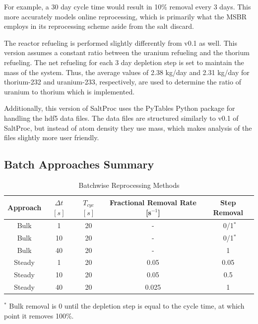 For example, a 30 day cycle time would result in 10\% removal every 3 days. This more accurately models online reprocessing, which is primarily what the MSBR employs in its reprocessing scheme aside from the salt discard.

The reactor refueling is performed slightly differently from v0.1 as well. This version assumes a constant ratio between the uranium refueling and the thorium refueling. The net refueling for each 3 day depletion step is set to maintain the mass of the system. Thus, the average values of 2.38 kg/day and 2.31 kg/day for thorium-232 and uranium-233, respectively, are used to determine the ratio of uranium to thorium which is implemented.

Additionally, this version of SaltProc uses the PyTables Python package for handling the hdf5 data files. The data files are structured similarly to v0.1 of SaltProc, but instead of atom density they use mass, which makes analysis of the files slightly more user friendly.

\subsection{Batch Approaches Summary}

\begin{table}[H]
\renewcommand{\arraystretch}{1.25}
\caption{Batchwise Reprocessing Methods}
\label{tab:batch_methods}
\begin{center}
\begin{tabular}{ | c | c | c | c | c | }
 \hline
        Approach & $\Delta t$ $[s]$ & $T_{cyc}$ $[s]$ & Fractional Removal Rate [s$^{-1}$] & Step Removal\\
 \hline
 \hline
        Bulk & 1 & 20 & - & \, 0/1$^{*}$\\
        Bulk & 10 & 20 & - & \, 0/1$^{*}$ \\
        Bulk & 40 & 20 & - & 1 \\
        Steady & 1 & 20 & 0.05 & 0.05\\
        Steady & 10 & 20 & 0.05 & 0.5\\
        Steady & 40 & 20 & 0.025 & 1\\
 \hline
\end{tabular}
\end{center}
\end{table}
        \begin{center}
\footnotesize{$^{*}$ Bulk removal is 0 until the depletion step is equal to the cycle time, at which point it removes 100\%.}\\
        \end{center}
        

